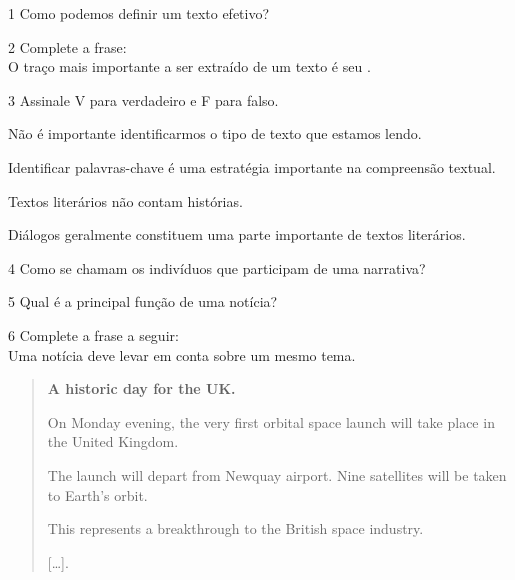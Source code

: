 
\num{1} Como podemos definir um texto efetivo?



\num{2} Complete a frase:\\
O traço mais importante a ser extraído de um texto é seu \preencher.



\num{3} Assinale V para verdadeiro e F para falso.

\begin{boxlist}
\item Não é importante identificarmos o tipo de texto que estamos lendo. 

\item Identificar palavras-chave é uma estratégia importante na
compreensão textual. 

\item Textos literários não contam histórias. 

\item Diálogos geralmente constituem uma parte importante de textos
literários. 
\end{boxlist}

\num{4} Como se chamam os indivíduos que participam de uma narrativa?



\num{5} Qual é a principal função de uma notícia?



\num{6} Complete a frase a seguir:\\
Uma notícia deve levar em conta \preencher sobre um mesmo tema.


\begin{quote}
\textbf{A historic day for the UK.}

On Monday evening, the very first orbital space launch will take place in the United Kingdom.

The launch will depart from Newquay airport. Nine satellites will be taken to Earth’s orbit.

This represents a breakthrough to the British space industry.

{[}\ldots{}{]}.

\end{quote}

